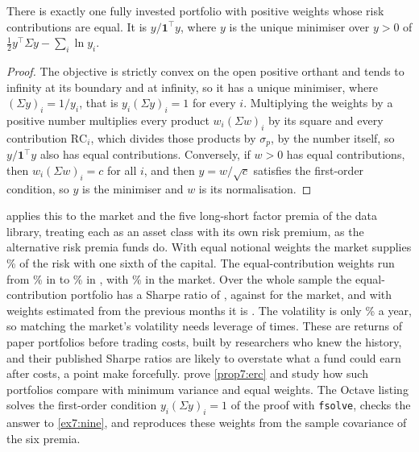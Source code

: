 \begin{chapterrefs}
\begin{proposition}\label{prop7:erc}
There is exactly one fully invested portfolio with positive weights whose risk contributions are
equal. It is $y/\mathbf 1^\top y$, where $y$ is the unique minimiser over $y>0$ of
$\frac12y^\top\Sigma y-\sum_i\ln y_i$.
\end{proposition}

\begin{proof}
The objective is strictly convex on the open positive orthant and tends to infinity at its boundary
and at infinity, so it has a unique minimiser, where $(\Sigma y)_i=1/y_i$, that is $y_i(\Sigma y)_i=1$
for every $i$. Multiplying the weights by a positive number multiplies every product $w_i(\Sigma w)_i$ by its square
and every contribution $\mathrm{RC}_i$, which divides those products by $\sigma_p$, by the number itself,
so $y/\mathbf 1^\top y$ also has equal contributions. Conversely, if $w>0$ has equal contributions, then
$w_i(\Sigma w)_i=c$ for all $i$, and then $y=w/\sqrt c$
satisfies the first-order condition, so $y$ is the minimiser and $w$ is its normalisation.
\end{proof}

 applies this to the market and the five long-short factor premia of the data
library, treating each as an asset class with its own risk premium, as the alternative risk premia
funds do. With equal notional weights the market supplies \rpEqMktShare\% of the risk with one sixth of the
capital. The equal-contribution
weights run from \rpErcMin\% in \rpErcMinName{} to \rpErcMax\% in \rpErcMaxName, with \rpErcMkt\% in the
market. Over the whole sample the equal-contribution portfolio has a Sharpe ratio of \rpSRerc, against \rpSRmkt{} for the market, and with
weights estimated from the previous \csW{} months it is \rpSRrolling. The volatility is only \rpVolErc\% a
year, so matching the market's volatility needs leverage of \rpLev{} times. These are returns of paper
portfolios before trading costs, built by researchers who knew the history, and their published Sharpe
ratios are likely to overstate what a fund could earn after costs, a point \textcite{harvey2016} make forcefully.
\textcite{maillard2010} prove \cref{prop7:erc} and study how such portfolios compare with minimum
variance and equal weights.
The Octave listing solves the first-order condition $y_i(\Sigma y)_i=1$ of the proof with
\texttt{fsolve}, checks the answer to \cref{ex7:nine}, and reproduces these weights from the sample
covariance of the six premia.



\end{chapterrefs}

